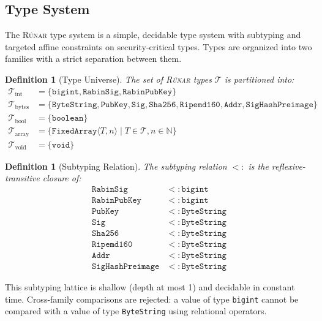 \documentclass[11pt,a4paper]{article}
\newtheorem{definition}[theorem]{Definition}
\newcommand{\runar}{\textsc{Rúnar}}
\newcommand{\bs}{\texttt{ByteString}}
\newcommand{\bigintty}{\texttt{bigint}}
\newcommand{\boolty}{\texttt{boolean}}
\newcommand{\voidty}{\texttt{void}}
\newcommand{\subtype}{\mathrel{<:}}
\begin{document}
\subsection{Type System}
\label{sec:types}

The \runar{} type system is a simple, decidable type system with subtyping
and targeted affine constraints on security-critical types. Types are
organized into two families with a strict separation between them.

\begin{definition}[Type Universe]
The set of \runar{} types $\mathcal{T}$ is partitioned into:
\begin{align}
\mathcal{T}_{\mathrm{int}} &= \{ \bigintty, \texttt{RabinSig}, \texttt{RabinPubKey} \} \\
\mathcal{T}_{\mathrm{bytes}} &= \{ \bs, \texttt{PubKey}, \texttt{Sig}, \texttt{Sha256}, \texttt{Ripemd160}, \texttt{Addr}, \texttt{SigHashPreimage} \} \\
\mathcal{T}_{\mathrm{bool}} &= \{ \boolty \} \\
\mathcal{T}_{\mathrm{array}} &= \{ \texttt{FixedArray}\langle T, n \rangle \mid T \in \mathcal{T}, n \in \mathbb{N} \} \\
\mathcal{T}_{\mathrm{void}} &= \{ \voidty \}
\end{align}
\end{definition}

\begin{definition}[Subtyping Relation]
\label{def:subtyping}
The subtyping relation $\subtype$ is the reflexive-transitive closure of:
\begin{align}
\texttt{RabinSig} &\subtype \bigintty \\
\texttt{RabinPubKey} &\subtype \bigintty \\
\texttt{PubKey} &\subtype \bs \\
\texttt{Sig} &\subtype \bs \\
\texttt{Sha256} &\subtype \bs \\
\texttt{Ripemd160} &\subtype \bs \\
\texttt{Addr} &\subtype \bs \\
\texttt{SigHashPreimage} &\subtype \bs
\end{align}
\end{definition}

This subtyping lattice is shallow (depth at most 1) and decidable in constant
time. Cross-family comparisons are rejected: a value of type \bigintty{}
cannot be compared with a value of type \bs{} using relational operators.
\end{document}

